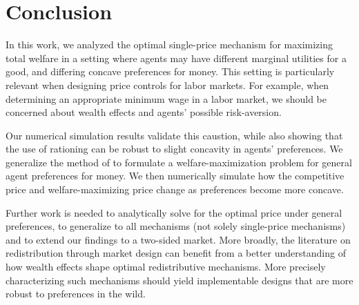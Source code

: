 \documentclass[AER]{AEA}
\begin{document}
\section{Conclusion}
\label{sec:conclusion}

In this work, we analyzed the optimal single-price mechanism for maximizing total welfare in a setting where agents may have different marginal utilities for a good, and differing concave preferences for money. This setting is particularly relevant when designing price controls for labor markets. For example, when determining an appropriate minimum wage in a labor market, we should be concerned about wealth effects and agents' possible risk-aversion.

Our numerical simulation results validate this caustion, while also showing that the use of rationing can be robust to slight concavity in agents' preferences. We generalize the method of \cite{dworczak-2020} to formulate a welfare-maximization problem for general agent preferences for money. We then numerically simulate how the competitive price and welfare-maximizing price change as preferences become more concave.

Further work is needed to analytically solve for the optimal price under general preferences, to generalize to all mechanisms (not solely single-price mechanisms) and to extend our findings to a two-sided market. More broadly, the literature on redistribution through market design can benefit from a better understanding of how wealth effects shape optimal redistributive mechanisms. More precisely characterizing such mechanisms should yield implementable designs that are more robust to preferences in the wild.





\end{document}
